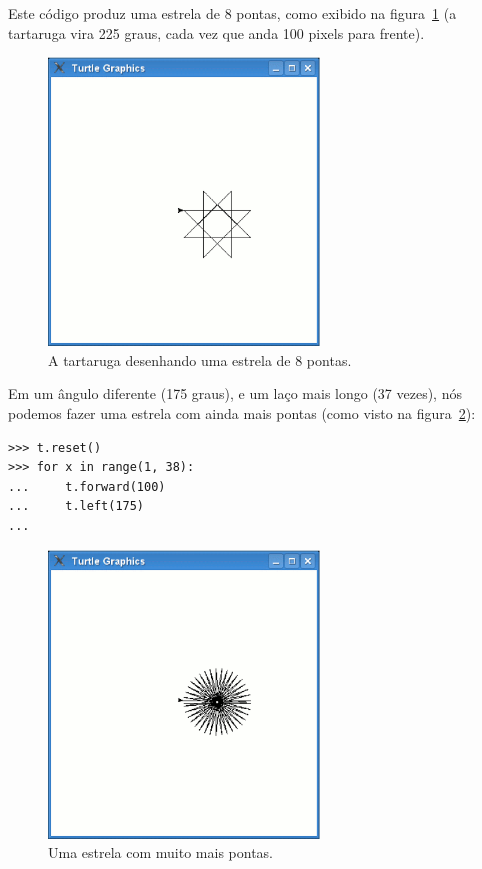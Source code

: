 Este código produz uma estrela de 8 pontas, como exibido na figura~\ref{fig20} (a tartaruga vira 225 graus, cada vez que anda 100 pixels para frente).

\begin{figure}
\begin{center}
\includegraphics[width=72mm]{eps/figure20.eps}
\end{center}
\caption{A tartaruga desenhando uma estrela de 8 pontas.}\label{fig20}
\end{figure}

\noindent
Em um ângulo diferente (175 graus), e um laço mais longo (37 vezes), nós podemos fazer uma estrela com ainda mais pontas (como visto na figura~\ref{fig21}):

\begin{listing}
\begin{verbatim}
>>> t.reset()
>>> for x in range(1, 38):
...     t.forward(100)
...     t.left(175)
...
\end{verbatim}
\end{listing}

\begin{figure}
\begin{center}
\includegraphics[width=72mm]{eps/figure21.eps}
\end{center}
\caption{Uma estrela com muito mais pontas.}\label{fig21}
\end{figure}

